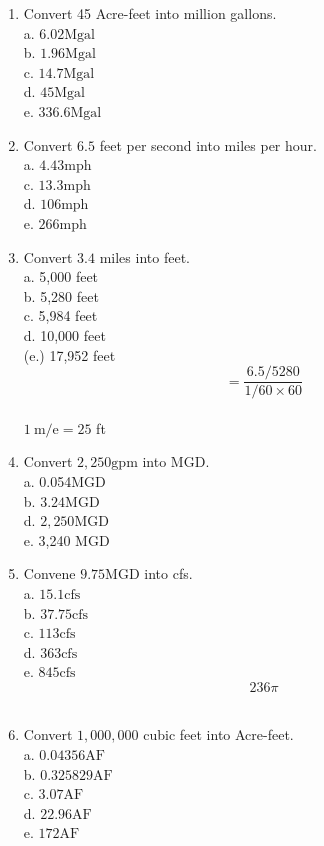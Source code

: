 \documentclass{article}
\begin{document}
\begin{enumerate}
\item Convert 45 Acre-feet into million gallons.\\
a. $6.02 \mathrm{Mgal}$\\
b. $1.96 \mathrm{Mgal}$\\
c.  $14.7 \mathrm{Mgal}$\\
d. $45 \mathrm{Mgal}$\\
e. $336.6 \mathrm{Mgal}$\\

\item Convert $6.5$ feet per second into miles per hour.\\
a.  $4.43 \mathrm{mph}$\\
c. $13.3 \mathrm{mph}$\\
d. $106 \mathrm{mph}$\\
e. $266 \mathrm{mph}$\\

\item Convert $3.4$ miles into feet.\\
a. 5,000 feet\\
b. 5,280 feet\\
c. 5,984 feet\\
d. 10,000 feet\\
(e.) 17,952 feet\\
$$=\frac{6.5 / 5280}{1 / 60 \times 60}$$\\
$1 \mathrm{~m} / \mathrm{e}=25$ ft\\

\item Convert $2,250 \mathrm{gpm}$ into MGD.\\
a. 0.054MGD\\
b. $3.24 \mathrm{MGD}$\\
d. $2,250 \mathrm{MGD}$\\
e. 3,240 MGD\\

\item Convene $9.75 \mathrm{MGD}$ into cfs.\\
a.  $15.1 \mathrm{cfs}$\\
b. $37.75 \mathrm{cfs}$\\
c. $113 \mathrm{cfs}$\\
d. $363 \mathrm{cfs}$\\
e. $845 \mathrm{cfs}$\\
$$236 \pi$$\\

\item Convert $1,000,000$ cubic feet into Acre-feet.\\
a. $0.04356 \mathrm{AF}$\\
b. $0.325829 \mathrm{AF}$\\
c. $3.07 \mathrm{AF}$\\
d. $22.96 \mathrm{AF}$\\
e. $172 \mathrm{AF}$\\


\end{enumerate}
\end{document}
